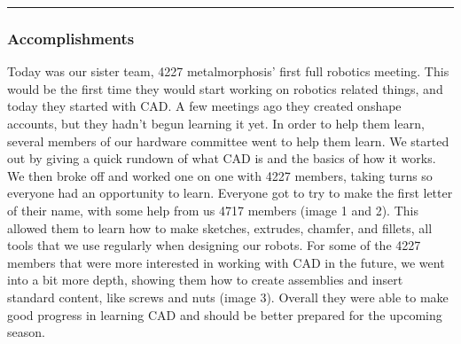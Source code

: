 \noindent\hfil\rule{\textwidth}{.4pt}\hfil

\subsubsection*{Accomplishments}
Today was our sister team, 4227 metalmorphosis’ first full robotics meeting. This would be the first time they would start working on robotics related things, and today they started with CAD. A few meetings ago they created onshape accounts, but they hadn’t begun learning it yet. In order to help them learn, several members of our hardware committee went to help them learn. We started out by giving a quick rundown of what CAD is and the basics of how it works. We then broke off and worked one on one with 4227 members, taking turns so everyone had an opportunity to learn.  Everyone got to try to make the first letter of their name, with some help from us 4717 members (image 1 and 2). This allowed them to learn how to make sketches, extrudes, chamfer, and fillets, all tools that we use regularly when designing our robots. For some of the 4227 members that were more interested in working with CAD in the future, we went into a bit more depth, showing them how to create assemblies and insert standard content, like screws and nuts (image 3). Overall they were able to make good progress in learning CAD and should be better prepared for the upcoming season.

